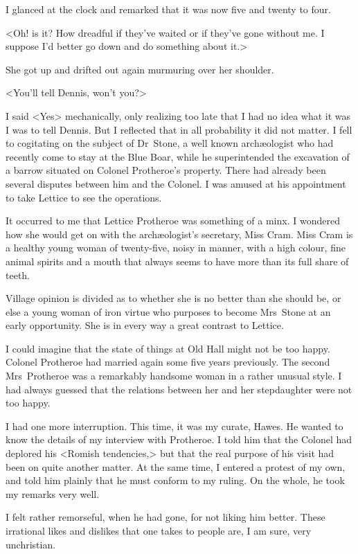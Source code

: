 I glanced at the clock and remarked that it was now five and twenty to four.

<Oh! is it? How dreadful if they've waited or if they've gone without me. I suppose I'd better go down and do something about it.>

She got up and drifted out again murmuring over her shoulder.

<You'll tell Dennis, won't you?>

I said <Yes> mechanically, only realizing too late that I had no idea what it was I was to tell Dennis. But I reflected that in all probability it did not matter. I fell to cogitating on the subject of Dr~Stone, a well known archæologist who had recently come to stay at the Blue Boar, while he superintended the excavation of a barrow situated on Colonel Protheroe's property. There had already been several disputes between him and the Colonel. I was amused at his appointment to take Lettice to see the operations.

It occurred to me that Lettice Protheroe was something of a minx. I wondered how she would get on with the archæologist's secretary, Miss Cram. Miss Cram is a healthy young woman of twenty-five, noisy in manner, with a high colour, fine animal spirits and a mouth that always seems to have more than its full share of teeth.

Village opinion is divided as to whether she is no better than she should be, or else a young woman of iron virtue who purposes to become Mrs~Stone at an early opportunity. She is in every way a great contrast to Lettice.

I could imagine that the state of things at Old Hall might not be too happy. Colonel Protheroe had married again some five years previously. The second Mrs~Protheroe was a remarkably handsome woman in a rather unusual style. I had always guessed that the relations between her and her stepdaughter were not too happy.

I had one more interruption. This time, it was my curate, Hawes. He wanted to know the details of my interview with Protheroe. I told him that the Colonel had deplored his <Romish tendencies,> but that the real purpose of his visit had been on quite another matter. At the same time, I entered a protest of my own, and told him plainly that he must conform to my ruling. On the whole, he took my remarks very well.

I felt rather remorseful, when he had gone, for not liking him better. These irrational likes and dislikes that one takes to people are, I am sure, very unchristian.


